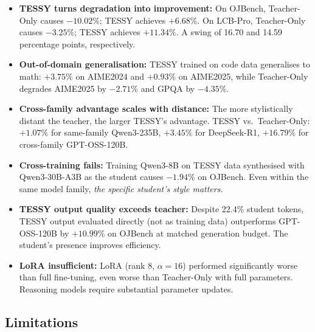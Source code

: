 \documentclass[11pt]{article}
\begin{document}
\begin{itemize}
    \item \textbf{TESSY turns degradation into improvement:} On OJBench, Teacher-Only causes $-10.02\%$; TESSY achieves $+6.68\%$. On LCB-Pro, Teacher-Only causes $-3.25\%$; TESSY achieves $+11.34\%$. A swing of 16.70 and 14.59 percentage points, respectively.

    \item \textbf{Out-of-domain generalisation:} TESSY trained on code data generalises to math: $+3.75\%$ on AIME2024 and $+0.93\%$ on AIME2025, while Teacher-Only degrades AIME2025 by $-2.71\%$ and GPQA by $-4.35\%$.

    \item \textbf{Cross-family advantage scales with distance:} The more stylistically distant the teacher, the larger TESSY's advantage. TESSY vs.\ Teacher-Only: $+1.07\%$ for same-family Qwen3-235B, $+3.45\%$ for DeepSeek-R1, $+16.79\%$ for cross-family GPT-OSS-120B.

    \item \textbf{Cross-training fails:} Training Qwen3-8B on TESSY data synthesised with Qwen3-30B-A3B as the student causes $-1.94\%$ on OJBench. Even within the same model family, \textit{the specific student's style matters}.

    \item \textbf{TESSY output quality exceeds teacher:} Despite 22.4\% student tokens, TESSY output evaluated directly (not as training data) outperforms GPT-OSS-120B by $+10.99\%$ on OJBench at matched generation budget. The student's presence improves efficiency.

    \item \textbf{LoRA insufficient:} LoRA (rank 8, $\alpha = 16$) performed significantly worse than full fine-tuning, even worse than Teacher-Only with full parameters. Reasoning models require substantial parameter updates.
\end{itemize}

\subsection{Limitations}
\end{document}
